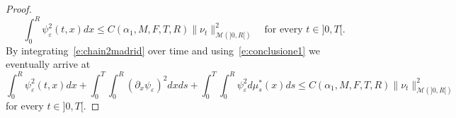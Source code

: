 \documentclass[11pt,leqno]{amsart}
\numberwithin{equation}{section}
\begin{document}
\begin{proof}
\begin{equation}
\label{e:conclusione1}
      \int_0^R \psi^2_{\varepsilon} (t, x)dx 
      \leq 
      C(\alpha_1, M, F, T, R) 
      \| \nu_t \|^2_{\mathcal M (]0, R[)} 
      \quad \text{for  every $t \in ]0, T[$.}
\end{equation}
By integrating~\eqref{e:chain2madrid} over time 
and using~\eqref{e:conclusione1} we eventually arrive at 
\begin{equation}
  \label{e:conclusione2}
  \int_0^R \psi^2_{\varepsilon} (t, x)dx +
  \int_0^T \int_0^R ({\partial_x } \psi_{\varepsilon})^2 dx ds +
  \int_0^T \int_0^R \psi^2_{\varepsilon} d \mu_s^* (x) ds 
  \leq 
  C(\alpha_1, M, F, T, R) 
  \| \nu_t \|^2_{\mathcal M (]0, R[)} 
\end{equation}
for  every $t \in ]0, T[$.


\end{proof}
\end{document}
